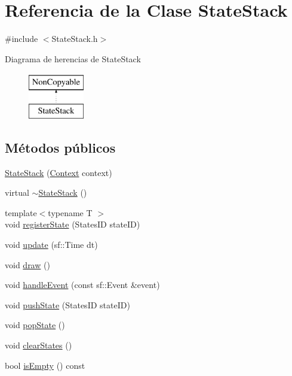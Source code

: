 \hypertarget{classStateStack}{}\section{Referencia de la Clase State\+Stack}
\label{classStateStack}


{\ttfamily \#include $<$State\+Stack.\+h$>$}

Diagrama de herencias de State\+Stack\begin{figure}[H]
\begin{center}
\leavevmode
\includegraphics[height=2.000000cm]{classStateStack}
\end{center}
\end{figure}
\subsection*{Métodos públicos}
\begin{DoxyCompactItemize}
\item 
\hyperlink{classStateStack_a435529bdbbf2bc703997b8598767e9f4}{State\+Stack} (\hyperlink{classContext}{Context} context)
\item 
virtual \hyperlink{classStateStack_ab2d31c81756ff400d3edfac2a5c3456c}{$\sim$\+State\+Stack} ()
\item 
{\footnotesize template$<$typename T $>$ }\\void \hyperlink{classStateStack_a377470304b48fdd024ce37aaf5d2e127}{register\+State} (States\+I\+D state\+I\+D)
\item 
void \hyperlink{classStateStack_ae90af9f56ce7774d47d0407e2680c27d}{update} (sf\+::\+Time dt)
\item 
void \hyperlink{classStateStack_a0990b973b2a0bdf8fad2f326e564931a}{draw} ()
\item 
void \hyperlink{classStateStack_a70d3ffad9da499b8356789115f3e2acf}{handle\+Event} (const sf\+::\+Event \&event)
\item 
void \hyperlink{classStateStack_ac93b7e023e92a9bce352fce6e3ceecf0}{push\+State} (States\+I\+D state\+I\+D)
\item 
void \hyperlink{classStateStack_a7e050a57b798295c2344f1318765b5ee}{pop\+State} ()
\item 
void \hyperlink{classStateStack_a49f0703d4037c3bf63494e64cb09898d}{clear\+States} ()
\item 
bool \hyperlink{classStateStack_a63a73898d24eb0a68cac0215a9fda4fc}{is\+Empty} () const 
\end{DoxyCompactItemize}



